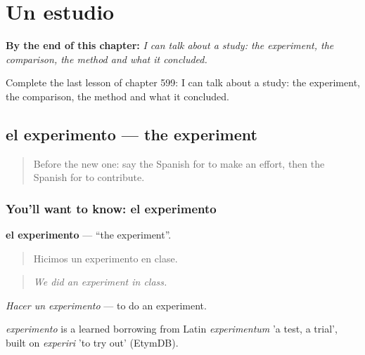 
\chapter{Un estudio}
\label{ch:es-un-estudio}

\begin{chapteropening}
\textbf{By the end of this chapter:} \emph{I can talk about a study: the experiment, the comparison, the method and what it concluded.}

Complete the last lesson of chapter 599: I can talk about a study: the experiment, the comparison, the method and what it concluded.
\end{chapteropening}

\section[el experimento]{el experimento — the experiment}

\label{lesson:ES-C599-experimento}



\begin{quote}
Before the new one: say the Spanish for to make an effort, then the Spanish for to contribute.
\end{quote}

\subsection*{You'll want to know: el experimento}
\textbf{el experimento} — \textquotedblleft{}the experiment\textquotedblright{}.

\begin{quote}
Hicimos un experimento en clase.
\end{quote}

\begin{quote}
\emph{We did an experiment in class.}
\end{quote}

\emph{Hacer un experimento} — to do an experiment.

\begin{cousinweb}
\emph{experimento} is a learned borrowing from Latin \emph{experimentum} 'a test, a trial', built on \emph{experiri} 'to try out' (EtymDB).
\end{cousinweb}

